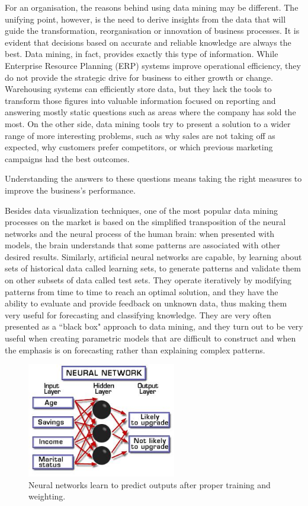 For an organisation, the reasons behind using data mining may be different.
The unifying point, however, is the need to derive insights from the data that will guide the transformation, reorganisation or innovation of business processes.
It is evident that decisions based on accurate and reliable knowledge are always the best. Data mining, in fact, provides exactly this type of information.
While Enterprise Resource Planning (ERP) systems improve operational efficiency, they do not provide the strategic drive for business to either growth or change. Warehousing systems can efficiently store data, but they lack the tools to transform those figures into valuable information focused on reporting and answering mostly static questions such as areas where the company has sold the most. On the other side, data mining tools try to present a solution to a wider range of more interesting problems, such as why sales are not taking off as expected, why customers prefer competitors, or which previous marketing campaigns had the best outcomes.

Understanding the answers to these questions means taking the right measures to improve the business’s performance.

Besides data visualization techniques, one of the most popular data mining processes on the market is based on the simplified transposition of the neural networks and the neural process of the human brain: when presented with models, the brain understands that some patterns are associated with other desired results. Similarly, artificial neural networks are capable, by learning about sets of historical data called learning sets, to generate patterns and validate them on other subsets of data called test sets. They operate iteratively by modifying patterns from time to time to reach an optimal solution, and they have the ability to evaluate and provide feedback on unknown data, thus making them very useful for forecasting and classifying knowledge. They are very often presented as a ``black box" approach to data mining, and they turn out to be very useful when creating parametric models that are difficult to construct and when the emphasis is on forecasting rather than explaining complex patterns.


\vspace{0.5cm}
\begin{figure}[htbp]
  \centering
    \includegraphics[height=5cm]{images/neural}
  \caption{Neural networks learn to predict outputs after proper training and weighting.}
  \label{fig:neural}
\end{figure}
\vspace{0.5cm}

